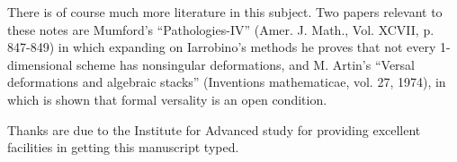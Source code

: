 There is of course much more literature in this subject. Two papers
relevant to these notes are Mumford's ``Pathologies-IV''
(Amer. J. Math., Vol. XCVII, p. 847-849) in which expanding on
Iarrobino's methods he proves that not every 1-dimensional scheme has
nonsingular deformations, and M. Artin's ``Versal deformations and
algebraic stacks'' (Inventions mathematicae, vol. 27, 1974), in which
is shown that formal versality is an open condition.

Thanks are due to the Institute for Advanced study for providing
excellent facilities in getting this manuscript typed.


